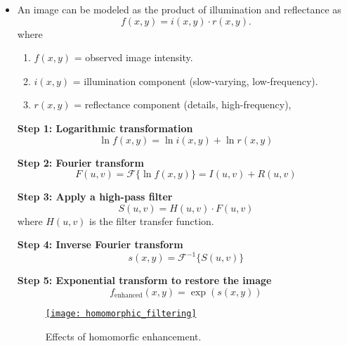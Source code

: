 \begin{itemize}
\item An image can be modeled as the product of illumination and
  reflectance \cite{wikipedia_luminance} as
\[
f(x, y) = i(x, y) \cdot r(x, y).
\]
where
\begin{enumerate}
\item $f(x, y)$ = observed image intensity.
\item $i(x, y)$ = illumination component (slow-varying, low-frequency).
\item $r(x, y)$ = reflectance component (details, high-frequency),
\end{enumerate}

\textbf{Step 1: Logarithmic transformation}
\[
\ln f(x, y) = \ln i(x, y) + \ln r(x, y)
\]

\textbf{Step 2: Fourier transform}
\[
F(u, v) = \mathcal{F}\{\ln f(x, y)\} = I(u, v) + R(u, v)
\]

\textbf{Step 3: Apply a high-pass filter}
\[
S(u, v) = H(u, v) \cdot F(u, v)
\]
where $H(u,v)$ is the filter transfer function.

\textbf{Step 4: Inverse Fourier transform}
\[
s(x, y) = \mathcal{F}^{-1}\{S(u, v)\}
\]

\textbf{Step 5: Exponential transform to restore the image}
\[
f_{\text{enhanced}}(x, y) = \exp(s(x, y))
\]

\begin{figure}[H]
  \vspace{-0ex}
  \centering
  \href{https://github.com/vicente-gonzalez-ruiz/medical_imaging/blob/main/notebooks/homomorphic_filtering.ipynb}{\texttt{[image: homomorphic\_filtering]}}
  \caption{Effects of homomorfic enhancement.}
  \label{fig:homomorphic_filtering}
\end{figure}

\end{itemize}
